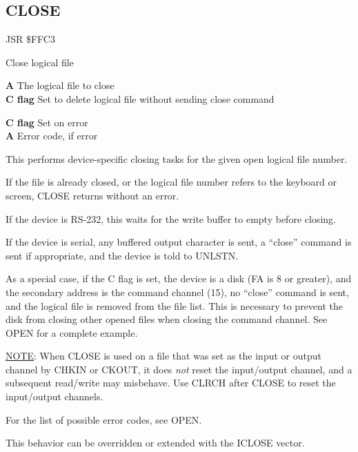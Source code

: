 \subsection{CLOSE}
\label{KERNAL Jump Table!CLOSE}
\begin{description}[leftmargin=2cm,style=nextline]
    \item [Address:] JSR \$FFC3
    \item [Description:] Close logical file
    \item [Inputs:]
        \textbf{A} The logical file to close \\
        \textbf{C flag} Set to delete logical file without sending close command
    \item [Outputs:]
        \textbf{C flag} Set on error \\
        \textbf{A} Error code, if error
    \item [Remarks:]
        This performs device-specific closing tasks for the given open logical file number.

        If the file is already closed, or the logical file number refers to the keyboard or screen, CLOSE returns without an error.

        If the device is RS-232, this waits for the write buffer to empty before closing.

        If the device is serial, any buffered output character is sent, a ``close'' command is sent if appropriate, and the device is told to UNLSTN.

        As a special case, if the C flag is set, the device is a disk (FA is 8 or greater), and the secondary address is the command channel (15), no ``close'' command is sent, and the logical file is removed from the file list. This is necessary to prevent the disk from closing other opened files when closing the command channel. See OPEN for a complete example.

        \underline{NOTE}: When CLOSE is used on a file that was set as the input or output channel by CHKIN or CKOUT, it does \emph{not} reset the input/output channel, and a subsequent read/write may misbehave. Use CLRCH after CLOSE to reset the input/output channels.

        For the list of possible error codes, see OPEN.

        This behavior can be overridden or extended with the ICLOSE vector.
    \item [Example:]
\end{description}


